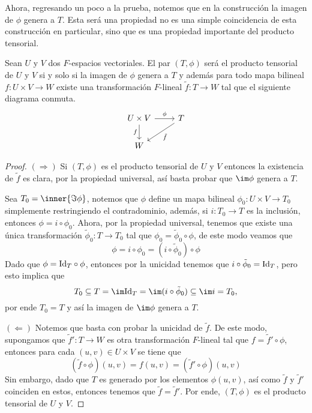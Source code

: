 Ahora, regresando un poco a la prueba, notemos que en la construcción la imagen de $\phi$ genera a $T$. Esta será una propiedad no es una simple coincidencia de esta construcción en particular, sino que es una propiedad importante del producto tensorial.

\begin{proposition}
  Sean $U$ y $V$ dos $F$-espacios vectoriales. El par $(T, \phi)$ será el producto tensorial de $U$ y $V$ si y solo si la imagen de $\phi$ genera a $T$ y además para todo mapa bilineal $f\colon U \times V \to W$ existe una transformación $F$-lineal $\tilde f\colon T \to W$ tal que el siguiente diagrama conmuta.
  \[
    \begin{tikzcd}
      U \times V \arrow[r, "\phi"] \arrow[d, "f"'] & T \arrow[ld, "\tilde f"] \\
      W                                            &                         
    \end{tikzcd}
  \]
\end{proposition}
\begin{proof}
  $(\Rightarrow)$ Si $(T, \phi)$ es el producto tensorial de $U$ y $V$ entonces la existencia de $\tilde f$ es clara, por la propiedad universal, así basta probar que $\im \phi$ genera a $T$.

  Sea $T_0 = \inner{\Im \phi}$, notemos que $\phi$ define un mapa bilineal $\phi_0\colon U \times V \to T_0$ simplemente restringiendo el contradominio, además, si $i \colon T_0 \to T$ es la inclusión, entonces $\phi = i \circ \phi_0$. Ahora, por la propiedad universal, tenemos que existe una única transformación $\tilde \phi_0 \colon T \to T_0$ tal que $\phi_0 = \tilde \phi_0 \circ \phi$, de este modo veamos que
  \[
    \phi = i \circ \phi_0 = (i \circ \tilde \phi_0) \circ \phi
  \]
  Dado que $\phi = \mathrm{Id}_T \circ \phi$, entonces por la unicidad tenemos que $i \circ \tilde \phi_0 = \mathrm{Id}_T$, pero esto implica que
  \[
    T_0 \subseteq T = \im \Id_T = \im(i \circ \tilde \phi_0) \subseteq \im i = T_0,
  \]
  por ende $T_0 = T$ y así la imagen de $\im \phi$ genera a $T$.

  $(\Leftarrow)$ Notemos que basta con probar la unicidad de $\tilde f$. De este modo, supongamos que $\tilde f'\colon T \to W$ es otra transformación $F$-lineal tal que $f = \tilde f' \circ \phi$, entonces para cada $(u,v) \in U \times V$ se tiene que
  \[
    (\tilde f \circ \phi)(u,v) = f(u,v)  = (\tilde f' \circ \phi)(u,v)
  \]
  Sin embargo, dado que $T$ es generado por los elementos $\phi(u,v)$, así como $\tilde f$ y $\tilde f'$ coinciden en estos, entonces tenemos que $\tilde f = \tilde f'$. Por ende, $(T, \phi)$ es el producto tensorial de $U$ y $V$.
\end{proof}


